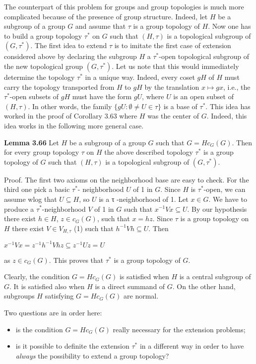 \documentclass[12pt]{article}
\begin{document}
    The counterpart of this problem for groups and group topologies is much more complicated because of the
presence of group structure. Indeed, let $H$ be a subgroup of a group $G$ and assume that $\tau$ is a group topology
of $H$. Now one has to build a group topology $\tau^*$ on $G$ such that $(H, \tau)$ is a topological subgroup of $(G, τ^*)$.
The first idea to extend $\tau$ is to imitate the first case of extension considered above by declaring the subgroup $H$
a $τ^*$-open topological subgroup of the new topological group $(G, τ^*)$. Let us note that this would immediately
determine the topology $τ^*$ in a unique way. Indeed, every coset $gH$ of $H$ must carry the topology transported
from $H$ to $gH$ by the translation $x \mapsto gx$, i.e., the $\tau^*$-open subsets of $gH$ must have the form $gU$, where $U$ is
an open subset of $(H, \tau )$. In other words, the family $\{gU : \emptyset \neq U \in \tau\}$ is a base of $τ^*$. This idea has worked in
the proof of Corollary 3.63 where $H$ was the center of $G$. Indeed, this idea works in the following more general
case.


\textbf{Lemma 3.66} Let $H$ be a subgroup of a group $G$ such that $G = Hc_G (G)$. Then for every group topology $\tau$ on
$H$ the above described topology $\tau^*$ is a group topology of $G$ such that $(H, \tau)$ is a topological subgroup of $(G, \tau^*)$.


    Proof. The first two axioms on the neighborhood base are easy to check. For the third one pick a basic $τ^*$-
neighborhood $U$ of 1 in $G$. Since $H$ is $\tau^*$-open, we can assume wlog that $U \subseteq H$, so $U$ is a τ -neighborhood of
1. Let $x \in G$. We have to produce a $τ^*$-neighborhood $V$ of 1 in $G$ such that $x^{-1} V x \subseteq U$. By our hypothesis
there exist $h \in H$, $z \in c_G (G)$, such that $x = hz$. Since $\tau$ is a group topology on $H$ there exist $V \in V_{H,\tau}$ (1) such
that $h^{-1} Vh \subseteq U$. Then


    $x^{-1} Vx = z^{-1} h^{-1} Vhz \subseteq z^{-1} Uz = U$


as $z \in c_G (G)$. This proves that $\tau^*$ is a group topology of $G$.


Clearly, the condition $G = Hc_G (G)$ is satisfied when $H$ is a central subgroup of $G$. It is satisfied also when
$H$ is a direct summand of $G$. On the other hand, subgroups $H$ satisfying $G = Hc_G (G)$ are normal.


    Two questions are in order here:


    \begin{itemize}

        \item is the condition $G = Hc_G (G)$ really necessary for the extension problems;

        \item is it possible to definite the extension $τ^*$ in a different way in order to have \emph{always} the possibility to
        extend a group topology?

    \end{itemize}
\end{document}
